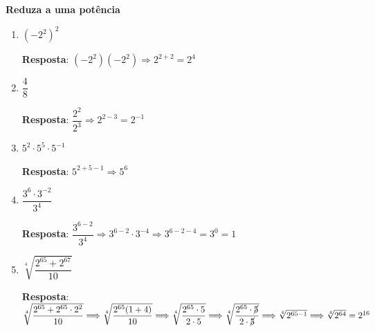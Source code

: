 	\textbf{Reduza a uma potência}
\begin{enumerate}[label=\alph*)]
	
	\item $ (-2^{2})^{2} $
	
	\indent \indent \textbf{Resposta}: $ (-2^{2})(-2^{2}) \Longrightarrow 2^{2+2} = 2^{4} $\\
	
	\item $ \dfrac{4}{8} $
	
	\indent \indent \textbf{Resposta}: $ \dfrac{2^{2}}{2^{3}} \Longrightarrow 2^{2-3} = 2^{-1} $\\
	
	\item $ 5^{2}\cdot 5^{5}\cdot 5^{-1} $
	
	\indent \indent \textbf{Resposta}: $ 5^{2+5-1} \Longrightarrow 5^{6} $ \\	
	
	\item $ \dfrac{3^{6}\cdot 3^{-2}}{3^{4}} $
	
	\indent \indent \textbf{Resposta}: $ \dfrac{3^{6-2}}{3^{4}} \Longrightarrow 3^{6 - 2}\cdot 3^{-4} \Longrightarrow 3^{6-2-4} = 3^{0} = 1 $ \\
	
	\item $ \sqrt[4]{\dfrac{2^{65}+2^{67}}{10}} $
	
	\indent \indent \textbf{Resposta}: $ \sqrt[4]{\dfrac{2^{65}+2^{65}\cdot 2^{2}}{10}} \Longrightarrow \sqrt[4]{\dfrac{2^{65}(1+4)}{10}} \Longrightarrow \sqrt[4]{\dfrac{2^{65}\cdot 5}{2\cdot 5}} \Longrightarrow \sqrt[4]{\dfrac{2^{65}\cdot \cancel{5}}{2\cdot \cancel{5}}} \Longrightarrow \sqrt[4]{2^{65-1}} \Longrightarrow \sqrt[4]{2^{64}} = 2^{16} $
	

\end{enumerate}